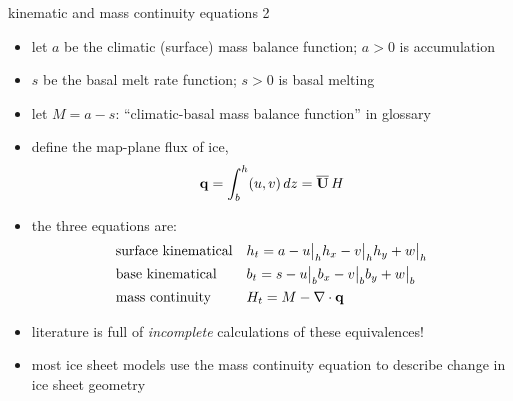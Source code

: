 \begin{frame}{kinematic and mass continuity equations 2}

\begin{itemize}
\item let $a$ be the climatic (surface) mass balance function;  $a>0$ is accumulation
\item $s$ be the basal melt rate function;  $s>0$ is basal melting
\item let $M=a-s$: ``climatic-basal mass balance function'' in glossary
\item define the map-plane flux of ice,
	$$\mathbf{q} = \int_{b}^{h} (u,v)\,dz = \overline{\mathbf{U}}\,H$$
\item the three equations are:
\begin{align*}
&\text{surface kinematical} && h_t = a - u\big|_h h_x - v\big|_h h_y + w\big|_h  \\
&\text{base kinematical} && b_t = s - u\big|_b b_x - v\big|_b b_y + w\big|_b  \\
&\text{mass continuity} && H_t = M - \nabla\cdot \mathbf{q} \\
\end{align*}

\medskip
\item literature is full of \emph{incomplete} calculations of these equivalences!
\item most ice sheet models use the mass continuity equation to describe change in ice sheet geometry
\end{itemize}
\end{frame}


\begin{comment}
\begin{frame}{kinematic and mass continuity equations 3}

\begin{itemize}
\item literature is full of incomplete calculations of these shallow equivalences
\item \dots usually mixed in with small-parameter arguments about shallow stress balances
\item most ice sheet models use the mass continuity equation to describe change in ice sheet geometry
\item \dots but they could instead use the surface kinematical equation
\end{itemize}
\end{frame}
\end{comment}


